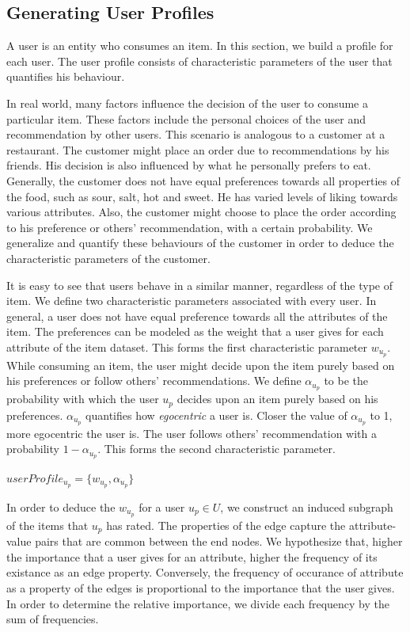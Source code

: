 \documentclass{acm_proc_article-sp}
\begin{document}
\subsection{Generating User Profiles}
\label{sec:userProf}

A user is an entity who consumes an item. In this section, we build a profile for each user. The user profile consists of characteristic parameters of the user that quantifies his behaviour.

In real world, many factors influence the decision of the user to consume a particular item. These factors include the personal choices of the user and recommendation by other users. This scenario is analogous to a customer at a restaurant. The customer might place an order due to recommendations by his friends. His decision is also influenced by what he personally prefers to eat. Generally, the customer does not have equal preferences towards all properties of the food, such as sour, salt, hot and sweet. He has varied levels of liking towards various attributes. Also, the customer might choose to place the order according to his preference or others' recommendation, with a certain probability. We generalize and quantify these behaviours of the customer in order to deduce the characteristic parameters of the customer.

It is easy to see that users behave in a similar manner, regardless of the type of item. We define two characteristic parameters associated with every user. In general, a user does not have equal preference towards all the attributes of the item. The preferences can be modeled as the weight that a user gives for each attribute of the item dataset. This forms the first characteristic parameter $w_{u_p}$. While consuming an item, the user might decide upon the item purely based on his preferences or follow others' recommendations. We define $\alpha_{u_p}$ to be the probability with which the user $u_p$ decides upon an item purely based on his preferences. $\alpha_{u_p}$ quantifies how \emph{egocentric} a user is. Closer the value of $\alpha_{u_p}$ to 1, more egocentric the user is. The user follows others' recommendation with a probability $1-\alpha_{u_p}$. This forms the second characteristic parameter.

$userProfile_{u_p} = \{w_{u_p}, \alpha_{u_p}\}$

In order to deduce the $w_{u_p}$ for a user $u_p \in U$, we construct an induced subgraph of the items that $u_p$ has rated. The properties of the edge capture the attribute-value pairs that are common between the end nodes. We hypothesize that, higher the importance that a user gives for an attribute, higher the frequency of its existance as an edge property. Conversely, the frequency of occurance of attribute as a property of the edges is proportional to the importance that the user gives. In order to determine the relative importance, we divide each frequency by the sum of frequencies.
\end{document}
